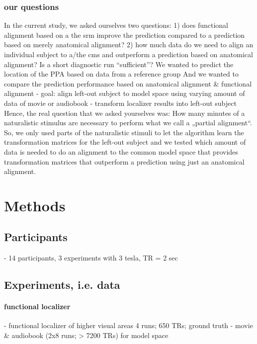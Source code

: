 \subsubsection{our questions}
In the current study, we asked ourselves two questions:
%
1) does functional alignment based on a the \ac{srm} improve the prediction
compared to a prediction based on merely anatomical alignment?
%
2) how much data do we need to align an individual subject to a/the \ac{cms} and
outperform a prediction based on anatomical alignment? Is a short diagnostic run
``sufficient''?
%
We wanted to predict the location of the PPA based on data from a reference
group
%
And we wanted to compare the prediction performance based on anatomical
alignment \& functional alignment
%
- goal: align left-out subject to model space using varying amount of data of
movie or audiobook - transform localizer results into left-out subject
%
Hence, the real question that we asked yourselves was: How many minutes of a
naturalistic stimulus are necessary to perform what we call a „partial
alignment“.
%
So, we only used parts of the naturalistic stimuli to let the algorithm learn
the transformation matrices for the left-out subject
%
and we tested which amount of data is needed to do an alignment to the common
model space that provides transformation matrices that outperform a prediction
using just an anatomical alignment.


\section{Methods}


\subsection{Participants}
- 14 participants, 3 experiments with 3 tesla, TR = 2 sec


\subsection{Experiments, i.e. data}


\paragraph{functional localizer}



- functional localizer of higher visual areas
%
4 runs; 650 TRs;
%
ground truth
- movie \& audiobook (2x8 runs; > 7200 TRs) for model space


